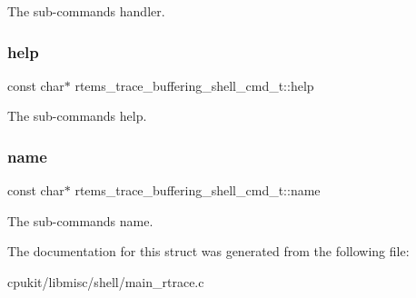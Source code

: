 The sub-\/command\textquotesingle{}s handler. \mbox{\label{structrtems__trace__buffering__shell__cmd__t_abecc68b0f3273da37487fe00eb4458bc}} 
\subsubsection{\texorpdfstring{help}{help}}
{\footnotesize\ttfamily const char$\ast$ rtems\+\_\+trace\+\_\+buffering\+\_\+shell\+\_\+cmd\+\_\+t\+::help}

The sub-\/command\textquotesingle{}s help. \mbox{\label{structrtems__trace__buffering__shell__cmd__t_a27a42077816731552d5db31b8bca1aea}} 
\subsubsection{\texorpdfstring{name}{name}}
{\footnotesize\ttfamily const char$\ast$ rtems\+\_\+trace\+\_\+buffering\+\_\+shell\+\_\+cmd\+\_\+t\+::name}

The sub-\/command\textquotesingle{}s name. 

The documentation for this struct was generated from the following file\+:\begin{DoxyCompactItemize}
\item 
cpukit/libmisc/shell/main\+\_\+rtrace.\+c\end{DoxyCompactItemize}
